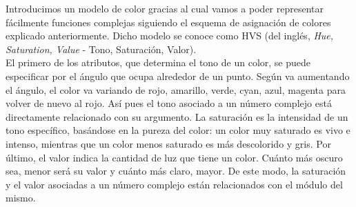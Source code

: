 Introducimos un modelo de color gracias al cual vamos a poder representar fácilmente funciones complejas siguiendo el esquema de asignación de colores explicado anteriormente. Dicho modelo se conoce como HVS (del inglés, \textit{Hue, Saturation, Value} - Tono, Saturación, Valor). \\

El primero de los atributos, que determina el tono de un color, se puede especificar por el ángulo que ocupa alrededor de un punto. Según va aumentando el ángulo, el color va variando de rojo, amarillo, verde, cyan, azul, magenta para volver de nuevo al rojo. Así pues el tono asociado a un número complejo está directamente relacionado con su argumento. La saturación es la intensidad de un tono específico, basándose en la pureza del color: un color muy saturado es vivo e intenso, mientras que un color menos saturado es más descolorido y gris. Por último, el valor indica la cantidad de luz que tiene un color. Cuánto más oscuro sea, menor será su valor y cuánto más claro, mayor. De este modo, la saturación y el valor asociadas a un número complejo están relacionados con el módulo del mismo. \\

